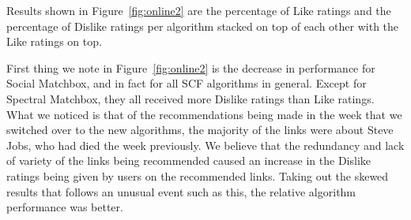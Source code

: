 Results shown in Figure~\ref{fig:online2} are the percentage of Like
ratings and the percentage of Dislike ratings per algorithm stacked on
top of each other with the Like ratings on top.

First thing we note in Figure~\ref{fig:online2} is the decrease in
performance for Social Matchbox, and in fact for all SCF algorithms in
general. Except for Spectral Matchbox, they all received more Dislike
ratings than Like ratings. What we noticed is that of the
recommendations being made in the week that we switched over to the
new algorithms, the majority of the links were about Steve Jobs, who
had died the week previously. We believe that the redundancy and lack
of variety of the links being recommended caused an increase in the
Dislike ratings being given by users on the recommended links. Taking
out the skewed results that follows an unusual event such as this, the
relative algorithm performance was better.

